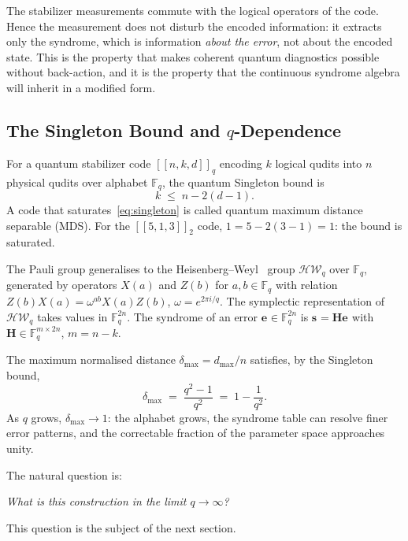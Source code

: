 \documentclass[11pt,a4paper]{article}
\theoremstyle{definition}
\newcommand{\Hm}{\mathbf{H}}
\newcommand{\sk}[1][]{\mathbf{s}_{#1}}
\newcommand{\ek}[1][]{\mathbf{e}_{#1}}
\newcommand{\Fbb}{\mathbb{F}}
\begin{document}
\begin{notebox}
The stabilizer measurements commute with the logical operators of the code. Hence the measurement does not disturb the encoded information: it extracts only the syndrome, which is information \emph{about the error}, not about the encoded state. This is the property that makes coherent quantum diagnostics possible without back-action, and it is the property that the continuous syndrome algebra will inherit in a modified form.
\end{notebox}

\subsection{The Singleton Bound and \texorpdfstring{$q$}{q}-Dependence}
\label{sec:513_singleton}

For a quantum stabilizer code $[\![n,k,d]\!]_q$ encoding $k$ logical qudits into $n$ physical qudits over alphabet $\Fbb_q$, the quantum Singleton bound is
\begin{equation}
  k \;\leq\; n - 2(d-1).
  \label{eq:singleton}
\end{equation}
A code that saturates~\eqref{eq:singleton} is called quantum maximum distance separable (MDS). For the $[\![5,1,3]\!]_2$ code, $1 = 5 - 2(3-1) = 1$: the bound is saturated.

The Pauli group generalises to the Heisenberg--Weyl~\cite{Knill1997} group $\mathcal{HW}_q$ over $\Fbb_q$, generated by operators $X(a)$ and $Z(b)$ for $a,b\in\Fbb_q$ with relation $Z(b)X(a) = \omega^{ab}X(a)Z(b)$, $\omega = e^{2\pi i/q}$. The symplectic representation of $\mathcal{HW}_q$ takes values in $\Fbb_q^{2n}$. The syndrome of an error $\ek\in\Fbb_q^{2n}$ is $\sk = \Hm \ek$ with $\Hm \in\Fbb_q^{m\times 2n}$, $m = n-k$.

The maximum normalised distance $\delta_{\max} = d_{\max}/n$ satisfies, by the Singleton bound,
\begin{equation}
  \delta_{\max} \;=\; \frac{q^2 - 1}{q^2}
  \;=\; 1 - \frac{1}{q^2}.
  \label{eq:dmax}
\end{equation}
As $q$ grows, $\delta_{\max}\to 1$: the alphabet grows, the syndrome table can resolve finer error patterns, and the correctable fraction of the parameter space approaches unity.

The natural question is:
\begin{center}
\emph{What is this construction in the limit $q\to\infty$?}
\end{center}
This question is the subject of the next section.
\end{document}
